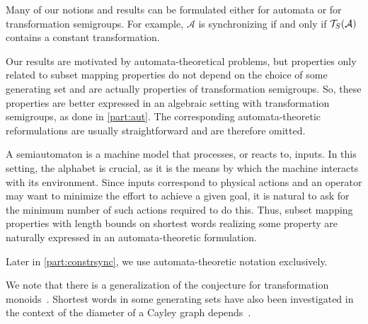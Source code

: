 Many of our notions and results
can be formulated either for automata or for transformation semigroups.
For example, $\mathcal A$ is synchronizing if and only if $\mathcal T_S(\mathcal A)$
contains a constant transformation.

Our results are motivated by automata-theoretical problems, but properties only
related to subset mapping properties do not depend on the choice of some generating set 
and are actually properties of transformation
semigroups. So, these properties are better expressed in an algebraic setting
with transformation semigroups, as done in \cref{part:aut}. The corresponding automata-theoretic 
reformulations are usually straightforward and are therefore omitted.

A semiautomaton is a machine model that processes, or reacts to, inputs.
In this setting, the alphabet is crucial, as it is the means by which
the machine interacts with its environment.
Since inputs correspond to physical actions and an operator may want
to minimize the effort to achieve a given goal,
it is natural to ask for the minimum number of such 
actions required to do this.
Thus, subset mapping properties with length bounds on shortest words
realizing some property are naturally expressed in an automata-theoretic formulation.

Later in \cref{part:constrsync}, we use automata-theoretic notation exclusively.

We note that there is a generalization of the \Cerny conjecture for transformation monoids~\cite{AnanichevVolkov04,Rystsov2024}.
Shortest words in some generating sets have also been investigated
in the context of the diameter of a Cayley graph depends~\cite{DBLP:journals/ijfcs/GonzeGJGV19}.
